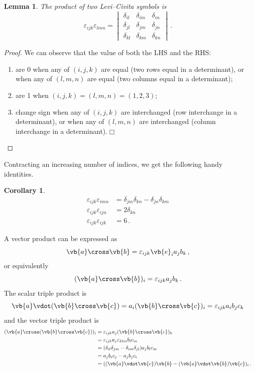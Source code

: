 \documentclass{article}
\theoremstyle{plain}\theoremheaderfont{\normalfont\itshape}\theorembodyfont{\rmfamily}\theoremseparator{.}\newtheorem*{rem}{Remark}\newtheorem*{ex}{Example}\newtheorem*{proof}{Proof}\newtheorem*{altp}{Alternative proof}
\theoremstyle{plain}\theoremheaderfont{\normalfont\bfseries}\theorembodyfont{\rmfamily}\theoremseparator{.}\newtheorem{thm}{Theorem}[section]\newtheorem{lem}[thm]{Lemma}\newtheorem{prop}[thm]{Proposition}\newtheorem*{cor}{Corollary}\newtheorem{defn}[thm]{Definition}\newtheorem{clm}[thm]{Claim}\newtheorem{clminproof}{Claim}
\theoremstyle{break}\theoremheaderfont{\normalfont\itshape}\theorembodyfont{\rmfamily}\theoremseparator{.\medskip}\newtheorem*{proofskip}{Proof}\newtheorem*{exs}{Examples}\newtheorem*{rems}{Remarks}
\theoremstyle{break}\theoremheaderfont{\normalfont\bfseries}\theorembodyfont{\rmfamily}\theoremseparator{.\medskip}\newtheorem{lemskip}[thm]{Lemma}\newtheorem{defnskip}[thm]{Definition}\newtheorem{propskip}[thm]{Proposition}\newtheorem{thmskip}[thm]{Theorem}
\numberwithin{equation}{section}
\newcommand{\qed}{\hfill\ensuremath{\Box}}
\begin{document}
	\begin{lem}
		The product of two Levi--Civita symbols is
		\[
			\varepsilon_{ijk}\varepsilon_{lmn}=\begin{vmatrix}
			\delta_{il} & \delta_{im} & \delta_{in}\\
			\delta_{jl} & \delta_{jm} & \delta_{jn}\\
			\delta_{kl} & \delta_{km} & \delta_{kn}
		\end{vmatrix}\,.
		\]
	\end{lem}
	\begin{proof}
		We can observe that the value of both the LHS and the RHS:
		\begin{enumerate}[topsep=0pt,label=(\roman*)]
			\item are 0 when any of \((i,j,k)\) are equal (two rows equal in a determinant), or when any of \((l,m,n)\) are equal (two columns equal in a determinant);
			\item are 1 when \((i,j,k) = (l,m,n) = (1,2,3)\);
			\item change sign when any of \((i,j,k)\) are interchanged (row interchange in a determinant), or when any of \((l,m,n)\) are interchanged (column interchange in a determinant).\qed
		\end{enumerate}
	\end{proof}
	Contracting an increasing number of indices, we get the following handy identities.
	\begin{cor}
		\begin{align*}
			\varepsilon_{ijk}\varepsilon_{imn}&=\delta_{jm}\delta_{kn}-\delta_{jn}\delta_{km}\\
			\varepsilon_{ijk}\varepsilon_{ijn}&=2\delta_{kn}\\
			\varepsilon_{ijk}\varepsilon_{ijk}&=6\,.
		\end{align*}
	\end{cor}

	A vector product can be expressed as
	\[\vb{a}\cross\vb{b}=\varepsilon_{ijk}\vb{e}_ia_jb_k\,,\]
	or equivalently
	\[(\vb{a}\cross\vb{b})_i=\varepsilon_{ijk}a_jb_k\,.\]
	The scalar triple product is
	\[\vb{a}\vdot(\vb{b}\cross\vb{c})=a_i(\vb{b}\cross\vb{c})_i=\varepsilon_{ijk}a_ib_jc_k\]
	and the vector triple product is
	\begin{align*}
		(\vb{a}\cross(\vb{b}\cross\vb{c}))_i&=\varepsilon_{ijk}a_j(\vb{b}\cross\vb{c})_k\\
		&=\varepsilon_{ijk}a_j\varepsilon_{klm}b_lc_m\\
		&=(\delta_{il}\delta_{jm}-\delta_{im}\delta_{jl})a_jb_lc_m\\
		&=a_jb_ic_j-a_jb_jc_i\\
		&=((\vb{a}\vdot\vb{c})\vb{b}-(\vb{a}\vdot\vb{b})\vb{c})_i\,.
	\end{align*}
\end{document}
